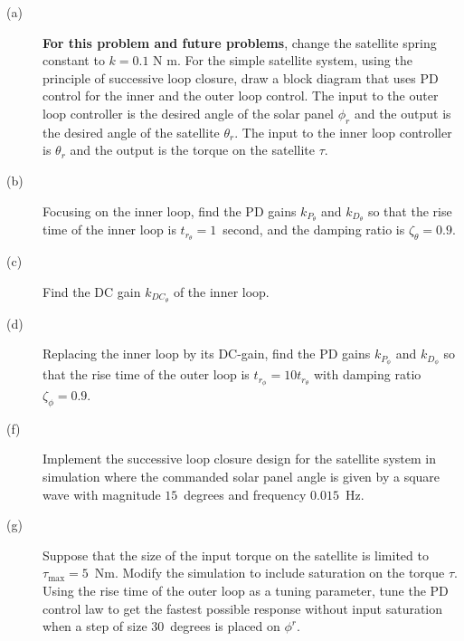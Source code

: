 
\begin{description}
\item[(a)] \textbf{For this problem and future problems}, change the satellite spring constant to $k = 0.1$ N m. For the simple satellite system, using the principle of successive loop closure, draw a block diagram that uses PD control for the inner and the outer loop control. The input to the outer loop controller is the desired angle of the solar panel $\phi_r$ and the output is the desired angle of the satellite $\theta_r$.  The input to the inner loop controller is $\theta_r$ and the output is the torque on the satellite $\tau$.
\item[(b)] Focusing on the inner loop, find the PD gains $k_{P_\theta}$ and $k_{D_\theta}$ so that the rise time of the inner loop is $t_{r_\theta}=1$~second, and the damping ratio is $\zeta_{\theta}=0.9$.
\item[(c)] Find the DC gain $k_{DC_\theta}$ of the inner loop.
\item[(d)] Replacing the inner loop by its DC-gain, find the PD gains $k_{P_\phi}$ and $k_{D_\phi}$ so that the rise time of the outer loop is $t_{r_\phi}= 10 t_{r_\theta}$ with damping ratio $\zeta_{\phi}=0.9$.
\item[(f)] Implement the successive loop closure design for the satellite system in simulation where the commanded solar panel angle is given by a square wave with magnitude $15$~degrees and frequency $0.015$~Hz.
\item[(g)] Suppose that the size of the input torque on the satellite is limited to $\tau_{\max}=5$~Nm.  Modify the simulation to include saturation on the torque $\tau$.  Using the rise time of the outer loop as a tuning parameter, tune the PD control law to get the fastest possible response without input saturation when a step of size $30$~degrees is placed on $\phi^r$.  
\end{description}

